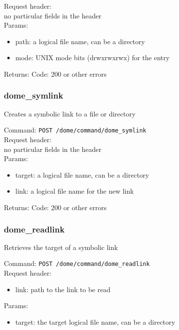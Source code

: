 \documentclass[a4paper,10pt]{scrreprt}
\begin{document}
Request header:\\
no particular fields in the header\\

Params:
\begin{itemize}
 \item path: a logical file name, can be a directory
 \item mode: UNIX mode bits (drwxrwxrwx) for the entry
\end{itemize}

Returns:
Code: 200 or other errors



\subsubsection{dome\_symlink}
Creates a symbolic link to a file or directory

Command:
\lstinline"POST /dome/command/dome_symlink"\\

Request header:\\
no particular fields in the header\\

Params:
\begin{itemize}
 \item target: a logical file name, can be a directory
 \item link: a logical file name for the new link
\end{itemize}

Returns:
Code: 200 or other errors





\subsubsection{dome\_readlink}
Retrieves the target of a symbolic link

Command:
\lstinline"POST /dome/command/dome_readlink"\\

Request header:\\
\begin{itemize}
 \item link: path to the link to be read
\end{itemize}

Params:
\begin{itemize}
 \item target: the target logical file name, can be a directory
\end{itemize}
\end{document}
